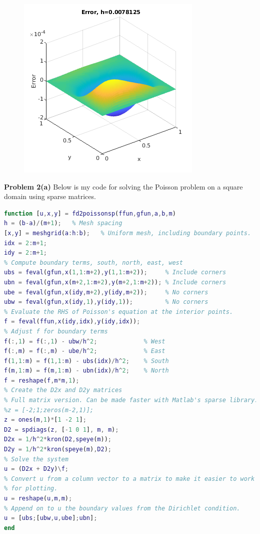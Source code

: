 \documentclass[12pt]{article}
\newcommand{\problem}[1]{\hspace{-4 ex} \large \textbf{Problem #1} }
\begin{document}
\begin{figure}[H]
\begin{minipage}{.5\textwidth}
		\includegraphics[width=1\linewidth]{hw4_p1_error}
		\label{fig:test2}
	\end{minipage}
\end{figure}



\bigbreak
\problem{2(a)} Below is my code for solving the Poisson problem on a square domain using sparse matrices.

\begin{lstlisting}[language=MATLAB]
function [u,x,y] = fd2poissonsp(ffun,gfun,a,b,m)
h = (b-a)/(m+1);   % Mesh spacing
[x,y] = meshgrid(a:h:b);   % Uniform mesh, including boundary points.
idx = 2:m+1;
idy = 2:m+1;
% Compute boundary terms, south, north, east, west
ubs = feval(gfun,x(1,1:m+2),y(1,1:m+2));     % Include corners
ubn = feval(gfun,x(m+2,1:m+2),y(m+2,1:m+2)); % Include corners
ube = feval(gfun,x(idy,m+2),y(idy,m+2));     % No corners
ubw = feval(gfun,x(idy,1),y(idy,1));         % No corners
% Evaluate the RHS of Poisson's equation at the interior points.
f = feval(ffun,x(idy,idx),y(idy,idx));
% Adjust f for boundary terms
f(:,1) = f(:,1) - ubw/h^2;             % West
f(:,m) = f(:,m) - ube/h^2;             % East
f(1,1:m) = f(1,1:m) - ubs(idx)/h^2;    % South
f(m,1:m) = f(m,1:m) - ubn(idx)/h^2;    % North
f = reshape(f,m*m,1);
% Create the D2x and D2y matrices
% Full matrix version. Can be made faster with Matlab's sparse library.
%z = [-2;1;zeros(m-2,1)];
z = ones(m,1)*[1 -2 1];
D2 = spdiags(z, [-1 0 1], m, m);
D2x = 1/h^2*kron(D2,speye(m));
D2y = 1/h^2*kron(speye(m),D2);
% Solve the system
u = (D2x + D2y)\f;
% Convert u from a column vector to a matrix to make it easier to work with
% for plotting.
u = reshape(u,m,m);
% Append on to u the boundary values from the Dirichlet condition.
u = [ubs;[ubw,u,ube];ubn];
end
\end{lstlisting}
\end{document}
